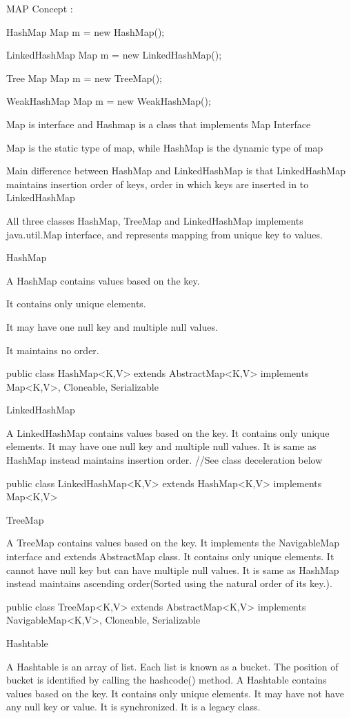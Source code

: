 MAP Concept :

HashMap Map m = new HashMap();

LinkedHashMap Map m = new LinkedHashMap();

Tree Map Map m = new TreeMap();

WeakHashMap Map m = new WeakHashMap();

Map is interface and Hashmap is a class that implements Map Interface

Map is the static type of map, while HashMap is the dynamic type of map

Main difference between HashMap and LinkedHashMap is that LinkedHashMap maintains insertion order of keys, 
order in which keys are inserted in to LinkedHashMap



All three classes HashMap, TreeMap and LinkedHashMap implements java.util.Map interface, and represents mapping from unique key to values.

HashMap

A HashMap contains values based on the key.

It contains only unique elements.

It may have one null key and multiple null values.

It maintains no order.

public class HashMap<K,V> extends AbstractMap<K,V> implements Map<K,V>, Cloneable, Serializable

LinkedHashMap

A LinkedHashMap contains values based on the key.
It contains only unique elements.
It may have one null key and multiple null values.
It is same as HashMap instead maintains insertion order. //See class deceleration below

public class LinkedHashMap<K,V> extends HashMap<K,V> implements Map<K,V>

TreeMap

A TreeMap contains values based on the key. It implements the NavigableMap interface and extends AbstractMap class.
It contains only unique elements.
It cannot have null key but can have multiple null values.
It is same as HashMap instead maintains ascending order(Sorted using the natural order of its key.).

public class TreeMap<K,V> extends AbstractMap<K,V> implements NavigableMap<K,V>, Cloneable, Serializable

Hashtable

A Hashtable is an array of list. Each list is known as a bucket. The position of bucket is identified by calling the hashcode() method. A Hashtable contains values based on the key.
It contains only unique elements.
It may have not have any null key or value.
It is synchronized.
It is a legacy class.

